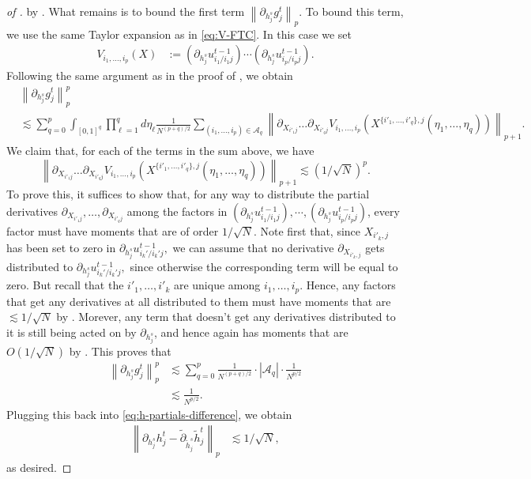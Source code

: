 \documentclass{article}
\newcommand{\1}{\mathbbm{1}}
\newcommand{\norm}[1]{\left\lVert#1\right\rVert}
\theoremstyle{plain}
\theoremstyle{definition}
\theoremstyle{remark}
\newcommand{\calA}{\mathcal{A}}
\begin{document}
\begin{proof}[of ]
    by . What remains is to bound the first term $ \norm{\partial_{ h_j^s} g_j^t}_p.$ To bound this term, we use the same Taylor expansion as in \eqref{eq:V-FTC}. In this case we set 
    \begin{align}\label{eq:V-expansion-new}
    V_{i_1,\dots,i_p}(X) &:= (\partial_{ h_j^s} u_{i_1/i_1j}^{t-1}) \cdots (\partial_{ h_j^s} u_{i_p/i_pj}^{t-1}).
\end{align}
Following the same argument as in the proof of , we obtain 
\begin{align}
    &\norm{\partial_{h_j^s} g_j^t}_p^p \nonumber\\
    &\lesssim  \sum_{q=0}^p \int_{[0,1]^q} \prod_{\ell=1}^q d\eta_\ell\frac{1}{N^{(p+q)/2}}\sum_{(i_1,\dots,i_p) \in \calA_q} \norm{\partial_{X_{i'_1j}}\dots \partial_{X_{i'_qj}} V_{i_1,\dots,i_p}(X^{\{i'_1,\dots,i'_q\},j}(\eta_1,\dots,\eta_q))}_{p+1}. \nonumber
\end{align}
We claim that, for each of the terms in the sum above, we have 
\[
\norm{\partial_{X_{i'_1j}}\dots \partial_{X_{i'_qj}} V_{i_1,\dots,i_p}(X^{\{i'_1,\dots,i'_q\},j}(\eta_1,\dots,\eta_q))}_{p+1} \lesssim (1/\sqrt{N})^p.
\]
To prove this, it suffices to show that, for any way to distribute the partial derivatives $\partial_{X_{i'_1j}},\dots, \partial_{X_{i'_qj}}$ among the factors in $(\partial_{ h_j^s} u_{i_1/i_1j}^{t-1}), \cdots ,(\partial_{ h_j^s} u_{i_p/i_pj}^{t-1})$, every factor must have moments that are of order  $1/\sqrt{N}$. Note first that, since $X_{i'_k,j}$ has been set to zero in $\partial_{h_j^s}u_{i_k'/i_k'j}^{t-1},$ we can assume that no derivative $\partial_{X_{i'_k,j}}$ gets distributed to $\partial_{h_j^s}u_{i_k'/i_k'j}^{t-1},$ since otherwise the corresponding term will be equal to zero. But recall that the $i'_1,\dots,i'_k$ are unique among $i_1,\dots,i_p.$ Hence, any factors that get any derivatives at all distributed to them must have moments that are $\lesssim 1/\sqrt{N}$ by . Morever, any term that doesn't get any derivatives distributed to it is still being acted on by $\partial_{h_j^s}$, and hence again has moments that are $O(1/\sqrt{N})$ by . This proves that
\begin{align*}
    \norm{\partial_{h_j^s} g_j^t}_p^p &\lesssim \sum_{q=0}^p \frac{1}{N^{(p+q)/2}} \cdot |\calA_q|\cdot \frac{1}{N^{p/2}} \\
    &\lesssim \frac{1}{N^{p/2}}.
\end{align*}
Plugging this back into \eqref{eq:h-partials-difference}, we obtain 
\begin{align*}
    \norm{ \partial_{h_j^s}h_j^t - \tilde{\partial}_{\tilde{h}_j^s}\tilde{h}_j^t }_p &\lesssim 1/\sqrt{N},
\end{align*}
as desired.


\end{proof}
\end{document}
